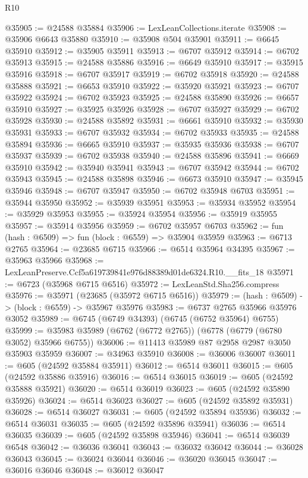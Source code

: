 \begin{lexlean}{R10}
\begin{coremodule}
@35905 := @24588 @35884
@35906 := LexLeanCollections.iterate
@35908 := @35906 @6643 @35880
@35910 := @35908 @504 @35901
@35911 := @6645 @35910
@35912 := @35905 @35911
@35913 := @6707 @35912
@35914 := @6702 @35913
@35915 := @24588 @35886
@35916 := @6649 @35910
@35917 := @35915 @35916
@35918 := @6707 @35917
@35919 := @6702 @35918
@35920 := @24588 @35888
@35921 := @6653 @35910
@35922 := @35920 @35921
@35923 := @6707 @35922
@35924 := @6702 @35923
@35925 := @24588 @35890
@35926 := @6657 @35910
@35927 := @35925 @35926
@35928 := @6707 @35927
@35929 := @6702 @35928
@35930 := @24588 @35892
@35931 := @6661 @35910
@35932 := @35930 @35931
@35933 := @6707 @35932
@35934 := @6702 @35933
@35935 := @24588 @35894
@35936 := @6665 @35910
@35937 := @35935 @35936
@35938 := @6707 @35937
@35939 := @6702 @35938
@35940 := @24588 @35896
@35941 := @6669 @35910
@35942 := @35940 @35941
@35943 := @6707 @35942
@35944 := @6702 @35943
@35945 := @24588 @35898
@35946 := @6673 @35910
@35947 := @35945 @35946
@35948 := @6707 @35947
@35950 := @6702 @35948 @6703
@35951 := @35944 @35950
@35952 := @35939 @35951
@35953 := @35934 @35952
@35954 := @35929 @35953
@35955 := @35924 @35954
@35956 := @35919 @35955
@35957 := @35914 @35956
@35959 := @6702 @35957 @6703
@35962 := fun (hash : @6509) => fun (block : @6559) => @35904 @35959
@35963 := @6713 @2765
@35964 := @23685 @6715
@35966 := @6514 @35964 @34395
@35967 := @35963 @35966
@35968 := LexLeanPreserve.Ccf5a619739841e976d88389d01de6324.R10.__fits_18
@35971 := @6723 (@35968 @6715 @6516)
@35972 := LexLeanStd.Sha256.compress
@35976 := @35971 (@23685 (@35972 @6715 @6516))
@35979 := (hash : @6509) -> (block : @6559) -> @35967 @35976
@35983 := @6737 @2765 @35966 @35976 @3052
@35989 := @6745 (@6749 @34393) (@6745 (@6752 @35964) @6755)
@35999 := @35983 @35989 (@6762 (@6772 @2765)) (@6778 (@6779 (@6780 @3052) @35966 @6755))
@36006 := @11413 @35989 @87 @2958 @2987 @3050 @35903 @35959
@36007 := @34963 @35910
@36008 := @36006 @36007
@36011 := @605 (@24592 @35884 @35911)
@36012 := @6514 @36011
@36015 := @605 (@24592 @35886 @35916)
@36016 := @6514 @36015
@36019 := @605 (@24592 @35888 @35921)
@36020 := @6514 @36019
@36023 := @605 (@24592 @35890 @35926)
@36024 := @6514 @36023
@36027 := @605 (@24592 @35892 @35931)
@36028 := @6514 @36027
@36031 := @605 (@24592 @35894 @35936)
@36032 := @6514 @36031
@36035 := @605 (@24592 @35896 @35941)
@36036 := @6514 @36035
@36039 := @605 (@24592 @35898 @35946)
@36041 := @6514 @36039 @6548
@36042 := @36036 @36041
@36043 := @36032 @36042
@36044 := @36028 @36043
@36045 := @36024 @36044
@36046 := @36020 @36045
@36047 := @36016 @36046
@36048 := @36012 @36047

\end{coremodule}
\end{lexlean}
